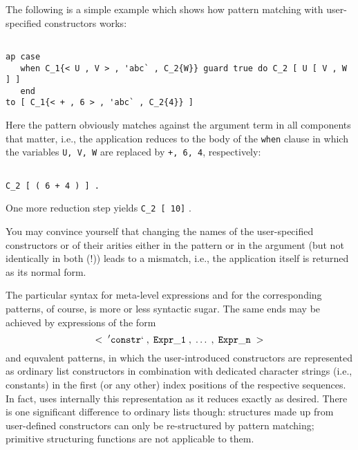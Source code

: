 The following is a simple example which shows how pattern matching with
user-specified constructors works:
\begin{verbatim}

ap case 
   when C_1{< U , V > , 'abc` , C_2{W}} guard true do C_2 [ U [ V , W ] ]
   end
to [ C_1{< + , 6 > , 'abc` , C_2{4}} ]

\end{verbatim}
Here the pattern obviously matches against the argument term in all components
that matter, i.e., the application reduces to the body of the {\tt when}
clause in which the variables {\tt U, V, W} are replaced by {\tt +, 6, 4},
respectively:
\begin{verbatim}

C_2 [ ( 6 + 4 ) ] .

\end{verbatim}
One more reduction step yields {\tt C\_2 [ 10]} .

You may convince yourself that changing the names of the user-specified
constructors or of their arities either in the pattern or in the argument
(but not identically in both (!)) leads to a mismatch, i.e., the application
itself is returned as its normal form.

The particular syntax for meta-level expressions and for the corresponding
 patterns, of course, is more or less syntactic sugar. The same ends may be achieved
by expressions of the form 
$$
{\tt <\;'constr`\;,\;Expr\_1\;,\;\ldots\;,\;Expr\_n\;>}
$$
and equvalent patterns, in which the user-introduced 
constructors are represented as
ordinary list constructors in combination with 
dedicated character strings (i.e., constants) in the first (or any other)
index positions of the respective sequences. In fact, \pired uses internally
this representation as it reduces exactly as desired. There is one significant
 difference to ordinary lists though: structures made up from user-defined constructors
can only be re-structured by pattern matching; primitive structuring functions are not
applicable to them.

